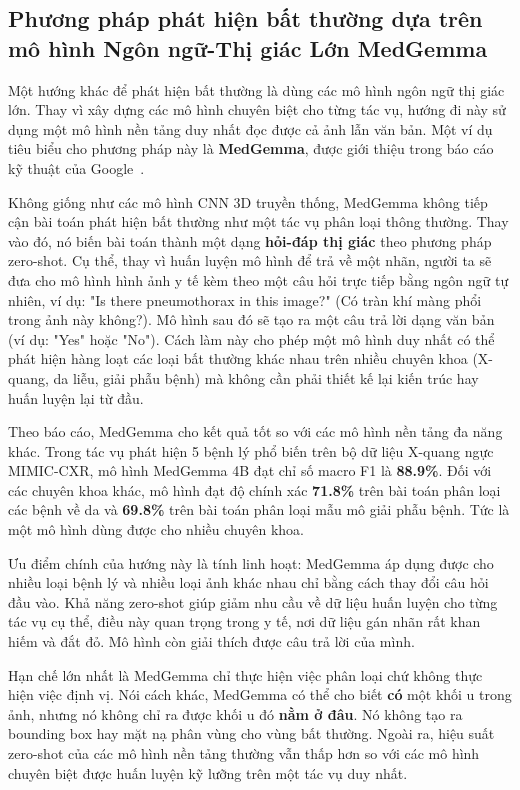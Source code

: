 \subsection{Phương pháp phát hiện bất thường dựa trên mô hình Ngôn ngữ-Thị giác Lớn MedGemma}

Một hướng khác để phát hiện bất thường là dùng các mô hình ngôn ngữ thị giác lớn. Thay vì xây dựng các mô hình chuyên biệt cho từng tác vụ, hướng đi này sử dụng một mô hình nền tảng duy nhất đọc được cả ảnh lẫn văn bản. Một ví dụ tiêu biểu cho phương pháp này là \textbf{MedGemma}, được giới thiệu trong báo cáo kỹ thuật của Google~\cite{google2025medgemma}.

Không giống như các mô hình CNN 3D truyền thống, MedGemma không tiếp cận bài toán phát hiện bất thường như một tác vụ phân loại thông thường. Thay vào đó, nó biến bài toán thành một dạng \textbf{hỏi-đáp thị giác} theo phương pháp zero-shot. Cụ thể, thay vì huấn luyện mô hình để trả về một nhãn, người ta sẽ đưa cho mô hình hình ảnh y tế kèm theo một câu hỏi trực tiếp bằng ngôn ngữ tự nhiên, ví dụ: "Is there pneumothorax in this image?" (Có tràn khí màng phổi trong ảnh này không?). Mô hình sau đó sẽ tạo ra một câu trả lời dạng văn bản (ví dụ: "Yes" hoặc "No"). Cách làm này cho phép một mô hình duy nhất có thể phát hiện hàng loạt các loại bất thường khác nhau trên nhiều chuyên khoa (X-quang, da liễu, giải phẫu bệnh) mà không cần phải thiết kế lại kiến trúc hay huấn luyện lại từ đầu.

Theo báo cáo, MedGemma cho kết quả tốt so với các mô hình nền tảng đa năng khác. Trong tác vụ phát hiện 5 bệnh lý phổ biến trên bộ dữ liệu X-quang ngực MIMIC-CXR, mô hình MedGemma 4B đạt chỉ số macro F1 là \textbf{88.9\%}. Đối với các chuyên khoa khác, mô hình đạt độ chính xác \textbf{71.8\%} trên bài toán phân loại các bệnh về da và \textbf{69.8\%} trên bài toán phân loại mẫu mô giải phẫu bệnh. Tức là một mô hình dùng được cho nhiều chuyên khoa.

Ưu điểm chính của hướng này là tính linh hoạt: MedGemma áp dụng được cho nhiều loại bệnh lý và nhiều loại ảnh khác nhau chỉ bằng cách thay đổi câu hỏi đầu vào. Khả năng zero-shot giúp giảm nhu cầu về dữ liệu huấn luyện cho từng tác vụ cụ thể, điều này quan trọng trong y tế, nơi dữ liệu gán nhãn rất khan hiếm và đắt đỏ. Mô hình còn giải thích được câu trả lời của mình.

Hạn chế lớn nhất là MedGemma chỉ thực hiện việc phân loại chứ không thực hiện việc định vị. Nói cách khác, MedGemma có thể cho biết \textbf{có} một khối u trong ảnh, nhưng nó không chỉ ra được khối u đó \textbf{nằm ở đâu}. Nó không tạo ra bounding box hay mặt nạ phân vùng cho vùng bất thường. Ngoài ra, hiệu suất zero-shot của các mô hình nền tảng thường vẫn thấp hơn so với các mô hình chuyên biệt được huấn luyện kỹ lưỡng trên một tác vụ duy nhất.


